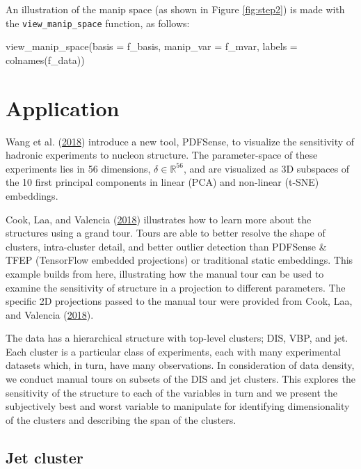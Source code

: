 \noindent An illustration of the manip space (as shown in Figure
\ref{fig:step2}) is made with the \texttt{view\_manip\_space} function,
as follows:

\begin{Schunk}
\begin{Sinput}

view_manip_space(basis = f_basis, 
                 manip_var = f_mvar, 
                 labels = colnames(f_data))
\end{Sinput}
\end{Schunk}

\hypertarget{sec:application}{%
\section{Application}\label{sec:application}}

Wang et al. (\protect\hyperlink{ref-wang_mapping_2018}{2018}) introduce
a new tool, PDFSense, to visualize the sensitivity of hadronic
experiments to nucleon structure. The parameter-space of these
experiments lies in 56 dimensions, \(\delta \in \mathbb{R}^{56}\), and
are visualized as 3D subspaces of the 10 first principal components in
linear (PCA) and non-linear (t-SNE) embeddings.

Cook, Laa, and Valencia
(\protect\hyperlink{ref-cook_dynamical_2018}{2018}) illustrates how to
learn more about the structures using a grand tour. Tours are able to
better resolve the shape of clusters, intra-cluster detail, and better
outlier detection than PDFSense \& TFEP (TensorFlow embedded
projections) or traditional static embeddings. This example builds from
here, illustrating how the manual tour can be used to examine the
sensitivity of structure in a projection to different parameters. The
specific 2D projections passed to the manual tour were provided from
Cook, Laa, and Valencia
(\protect\hyperlink{ref-cook_dynamical_2018}{2018}).

The data has a hierarchical structure with top-level clusters; DIS, VBP,
and jet. Each cluster is a particular class of experiments, each with
many experimental datasets which, in turn, have many observations. In
consideration of data density, we conduct manual tours on subsets of the
DIS and jet clusters. This explores the sensitivity of the structure to
each of the variables in turn and we present the subjectively best and
worst variable to manipulate for identifying dimensionality of the
clusters and describing the span of the clusters.

\hypertarget{jet-cluster}{%
\subsection{Jet cluster}\label{jet-cluster}}

